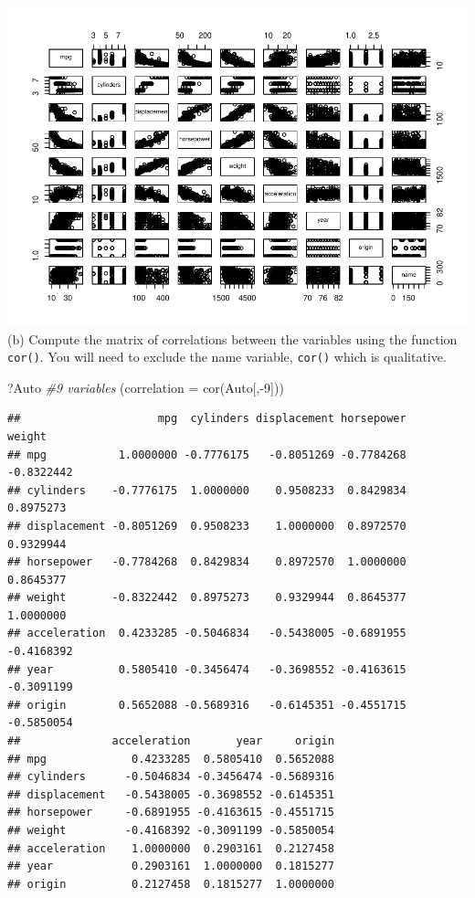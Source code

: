 \documentclass[
]{article}
\newenvironment{Shaded}{\begin{snugshade}}{\end{snugshade}}
\newcommand{\AttributeTok}[1]{\textcolor[rgb]{0.77,0.63,0.00}{#1}}
\newcommand{\CommentTok}[1]{\textcolor[rgb]{0.56,0.35,0.01}{\textit{#1}}}
\newcommand{\DecValTok}[1]{\textcolor[rgb]{0.00,0.00,0.81}{#1}}
\newcommand{\FunctionTok}[1]{\textcolor[rgb]{0.00,0.00,0.00}{#1}}
\newcommand{\NormalTok}[1]{#1}
\newcommand{\SpecialCharTok}[1]{\textcolor[rgb]{0.00,0.00,0.00}{#1}}
\begin{document}
\includegraphics{math4322_fall21_hw2_files/figure-latex/unnamed-chunk-9-1.pdf}
(b) Compute the matrix of correlations between the variables using the
function \texttt{cor()}. You will need to exclude the name variable,
\texttt{cor()} which is qualitative.

\begin{Shaded}
\begin{Highlighting}[]
\NormalTok{?Auto}
\CommentTok{\#9 variables}
\NormalTok{(}\AttributeTok{correlation =} \FunctionTok{cor}\NormalTok{(Auto[,}\SpecialCharTok{{-}}\DecValTok{9}\NormalTok{]))}
\end{Highlighting}
\end{Shaded}

\begin{verbatim}
##                     mpg  cylinders displacement horsepower     weight
## mpg           1.0000000 -0.7776175   -0.8051269 -0.7784268 -0.8322442
## cylinders    -0.7776175  1.0000000    0.9508233  0.8429834  0.8975273
## displacement -0.8051269  0.9508233    1.0000000  0.8972570  0.9329944
## horsepower   -0.7784268  0.8429834    0.8972570  1.0000000  0.8645377
## weight       -0.8322442  0.8975273    0.9329944  0.8645377  1.0000000
## acceleration  0.4233285 -0.5046834   -0.5438005 -0.6891955 -0.4168392
## year          0.5805410 -0.3456474   -0.3698552 -0.4163615 -0.3091199
## origin        0.5652088 -0.5689316   -0.6145351 -0.4551715 -0.5850054
##              acceleration       year     origin
## mpg             0.4233285  0.5805410  0.5652088
## cylinders      -0.5046834 -0.3456474 -0.5689316
## displacement   -0.5438005 -0.3698552 -0.6145351
## horsepower     -0.6891955 -0.4163615 -0.4551715
## weight         -0.4168392 -0.3091199 -0.5850054
## acceleration    1.0000000  0.2903161  0.2127458
## year            0.2903161  1.0000000  0.1815277
## origin          0.2127458  0.1815277  1.0000000
\end{verbatim}
\end{document}
